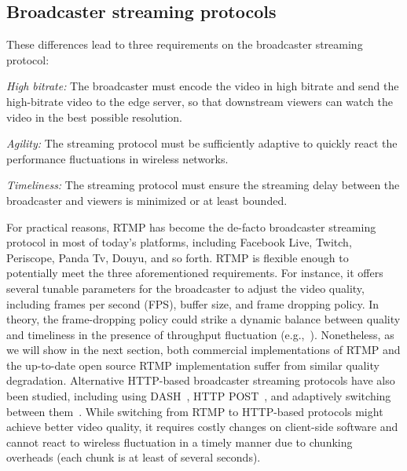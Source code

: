 \subsection{Broadcaster streaming protocols}

These differences lead to three requirements on the broadcaster streaming protocol:

\begin{packedenumerate}

\item {\em High bitrate:} The broadcaster must encode
the video in high bitrate and send the high-bitrate video
to the edge server, so that downstream viewers can watch
the video in the best possible resolution.

\item {\em Agility:} The streaming protocol must be sufficiently adaptive
to quickly react the performance fluctuations in wireless networks.

\item {\em Timeliness:} The streaming protocol must ensure the streaming
delay between the broadcaster and viewers is minimized
or at least bounded.

\end{packedenumerate}

For practical reasons, RTMP has become the de-facto
broadcaster streaming protocol in most of today's platforms,
including Facebook Live, Twitch, Periscope, Panda Tv,
Douyu, and so forth.
RTMP is flexible enough to potentially meet
the three aforementioned requirements.
For instance, it offers several tunable parameters for
the broadcaster to adjust the video quality, including
frames per second (FPS), buffer size, and frame dropping
policy.
In theory, the frame-dropping policy could
strike a dynamic balance between quality and timeliness
in the presence of throughput fluctuation
(e.g.,~\cite{huang2003adaptive,krasic2003quality,singh2004dynamic}).
Nonetheless, as we will show in the next section,
both commercial implementations of RTMP and
the up-to-date open source RTMP implementation suffer from similar quality
degradation.
Alternative HTTP-based broadcaster streaming protocols have also
been studied, including using DASH~\cite{pires2014dash}, HTTP POST~\cite{seo2012experimental},
and adaptively switching between them~\cite{wilk2016leveraging}.
While switching from RTMP to HTTP-based protocols might
achieve better video quality, it requires costly
changes on client-side software and cannot react to wireless
fluctuation in a timely manner due to chunking overheads
(each chunk is at least of
several seconds).

